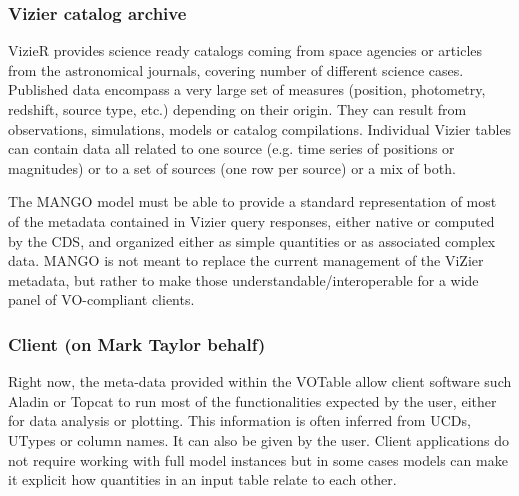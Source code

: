 

\subsubsection{Vizier catalog archive}
VizieR provides science ready catalogs coming from space agencies or articles from the astronomical journals, covering number of different science cases.
Published data encompass a very large set of measures (position, photometry, redshift, source type, etc.)
depending on their origin.
They can result from  observations, simulations, models or catalog compilations.
Individual Vizier tables can contain data all related to one source (e.g. time series of positions or magnitudes) or to a set of sources (one row per source) or a mix of both.

The MANGO model must be able to provide a standard representation of most of the metadata contained 
in Vizier query responses, either native or computed by the CDS, and organized either as 
simple quantities or as associated complex data.
MANGO is not meant to replace the current management of the ViZier metadata, but rather 
to make those understandable/interoperable for a wide panel of VO-compliant clients.

\subsubsection{Client (on Mark Taylor behalf)}
Right now, the meta-data provided within the VOTable allow client software such Aladin or Topcat to run most 
of the functionalities expected by the user, either for data analysis or plotting.
This information is often inferred from UCDs, UTypes or column names. It can also be given by the user.
Client applications do not require working with full model instances but in some cases models 
can make it explicit how quantities in an input table relate to each other.

